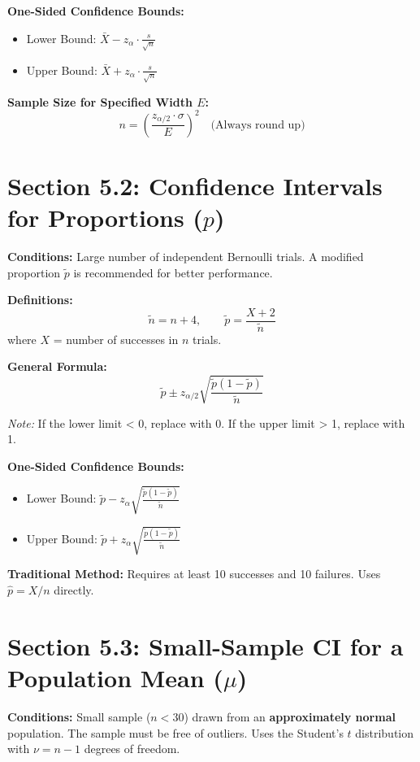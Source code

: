 \documentclass[11pt]{article}
\begin{document}
\textbf{One-Sided Confidence Bounds:}
\begin{itemize}[nosep]
    \item Lower Bound: $\bar{X} - z_{\alpha} \cdot \frac{s}{\sqrt{n}}$
    \item Upper Bound: $\bar{X} + z_{\alpha} \cdot \frac{s}{\sqrt{n}}$
\end{itemize}

\textbf{Sample Size for Specified Width $E$:}
\[n = \left( \frac{z_{\alpha/2} \cdot \sigma}{E} \right)^2 \quad \text{(Always round up)}\]

\section*{Section 5.2: Confidence Intervals for Proportions ($p$)}
\textbf{Conditions:} Large number of independent Bernoulli trials. A modified proportion $\tilde{p}$ is recommended for better performance.

\textbf{Definitions:}
\[\tilde{n} = n + 4, \qquad \tilde{p} = \frac{X + 2}{\tilde{n}}\]
where $X$ = number of successes in $n$ trials.

\textbf{General Formula:}
\[\tilde{p} \pm z_{\alpha/2} \sqrt{\frac{\tilde{p}(1 - \tilde{p})}{\tilde{n}}}\]

\textit{Note:} If the lower limit < 0, replace with 0. If the upper limit > 1, replace with 1.

\textbf{One-Sided Confidence Bounds:}
\begin{itemize}[nosep]
    \item Lower Bound: $\tilde{p} - z_{\alpha} \sqrt{\frac{\tilde{p}(1 - \tilde{p})}{\tilde{n}}}$
    \item Upper Bound: $\tilde{p} + z_{\alpha} \sqrt{\frac{\tilde{p}(1 - \tilde{p})}{\tilde{n}}}$
\end{itemize}

\textbf{Traditional Method:} Requires at least 10 successes and 10 failures. Uses $\hat{p} = X/n$ directly.

\section*{Section 5.3: Small-Sample CI for a Population Mean ($\mu$)}
\textbf{Conditions:} Small sample ($n < 30$) drawn from an \textbf{approximately normal} population. The sample must be free of outliers. Uses the Student's $t$ distribution with $\nu = n - 1$ degrees of freedom.
\end{document}
